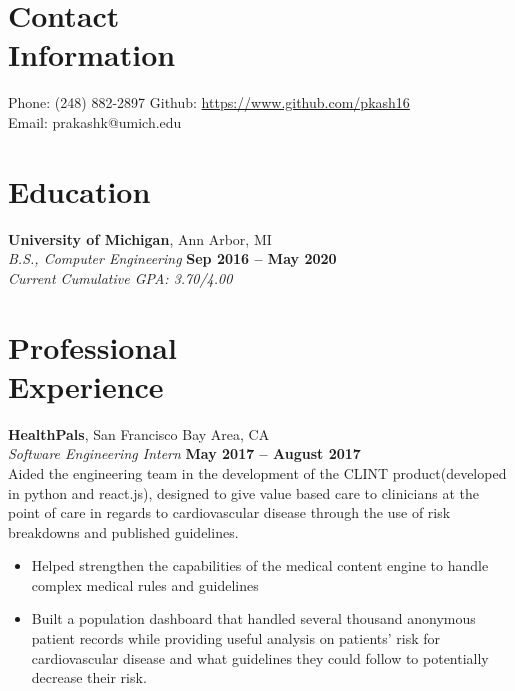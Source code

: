 \documentclass[margin,line]{resume}
\begin{document}
\begin{resume}
    \section{\mysidestyle Contact\\Information}

    Phone: (248) 882-2897       \hfill Github: \url{https://www.github.com/pkash16} \\
    \noindent Email: prakashk@umich.edu  \vspace{0mm}\\\vspace{-4.5mm}

    \section{\mysidestyle Education}

    \textbf{University of Michigan}, Ann Arbor, MI \vspace{2mm}\\\vspace{1mm}%
    \textsl{B.S., Computer Engineering} \hfill \textbf{Sep 2016 -- May 2020}\\
   	\emph{Current Cumulative GPA: 3.70/4.00}

    \section{\mysidestyle Professional\\Experience}

    \textbf{HealthPals}, San Francisco Bay Area, CA \vspace{2mm}\\\vspace{1mm}%
    \textsl{Software Engineering Intern} \hfill \textbf{May 2017 -- August 2017}\\
    Aided the engineering team in the development of the CLINT product(developed in python and react.js), designed to give value based care to clinicians at the point of care in regards to cardiovascular disease through the use of risk breakdowns and published guidelines. 

    \begin{itemize}
    \item Helped strengthen the capabilities of the medical content engine to handle complex medical rules and guidelines
    \item Built a population dashboard that handled several thousand anonymous patient records while providing useful analysis on patients' risk for cardiovascular disease and what guidelines they could follow to potentially decrease their risk.
    \end{itemize}



\end{resume}
\end{document}
